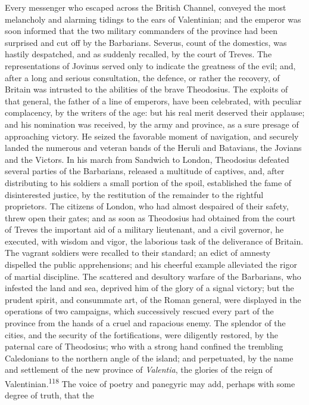 {{{{{{{{{{{{{{{{{{{{{{{{{{{{{{{{{{{{{{{{{{{{{{{{{{{{{{{{{{{{{{{{{{{{{{{{{{{{{{{{{{{{{{{{{{{{{{{{{{{{{{{{{{{{{{{{{{{{{{{{{{{{{{{{Every messenger who escaped across the British Channel, conveyed
the most melancholy and alarming tidings to the ears of
Valentinian; and the emperor was soon informed that the two
military commanders of the province had been surprised and cut
off by the Barbarians. Severus, count of the domestics, was
hastily despatched, and as suddenly recalled, by the court of
Treves. The representations of Jovinus served only to indicate
the greatness of the evil; and, after a long and serious
consultation, the defence, or rather the recovery, of Britain was
intrusted to the abilities of the brave Theodosius. The exploits
of that general, the father of a line of emperors, have been
celebrated, with peculiar complacency, by the writers of the age:
but his real merit deserved their applause; and his nomination
was received, by the army and province, as a sure presage of
approaching victory. He seized the favorable moment of
navigation, and securely landed the numerous and veteran bands of
the Heruli and Batavians, the Jovians and the Victors. In his
march from Sandwich to London, Theodosius defeated several
parties of the Barbarians, released a multitude of captives, and,
after distributing to his soldiers a small portion of the spoil,
established the fame of disinterested justice, by the restitution
of the remainder to the rightful proprietors. The citizens of
London, who had almost despaired of their safety, threw open
their gates; and as soon as Theodosius had obtained from the
court of Treves the important aid of a military lieutenant, and a
civil governor, he executed, with wisdom and vigor, the laborious
task of the deliverance of Britain. The vagrant soldiers were
recalled to their standard; an edict of amnesty dispelled the
public apprehensions; and his cheerful example alleviated the
rigor of martial discipline. The scattered and desultory warfare
of the Barbarians, who infested the land and sea, deprived him of
the glory of a signal victory; but the prudent spirit, and
consummate art, of the Roman general, were displayed in the
operations of two campaigns, which successively rescued every
part of the province from the hands of a cruel and rapacious
enemy. The splendor of the cities, and the security of the
fortifications, were diligently restored, by the paternal care of
Theodosius; who with a strong hand confined the trembling
Caledonians to the northern angle of the island; and perpetuated,
by the name and settlement of the new province of \textit{Valentia}, the
glories of the reign of Valentinian.\textsuperscript{118} The voice of poetry and
panegyric may add, perhaps with some degree of truth, that the
}}}}}}}}}}}}}}}}}}}}}}}}}}}}}}}}}}}}}}}}}}}}}}}}}}}}}}}}}}}}}}}}}}}}}}}}}}}}}}}}}}}}}}}}}}}}}}}}}}}}}}}}}}}}}}}}}}}}}}}}}}}}}}}}
